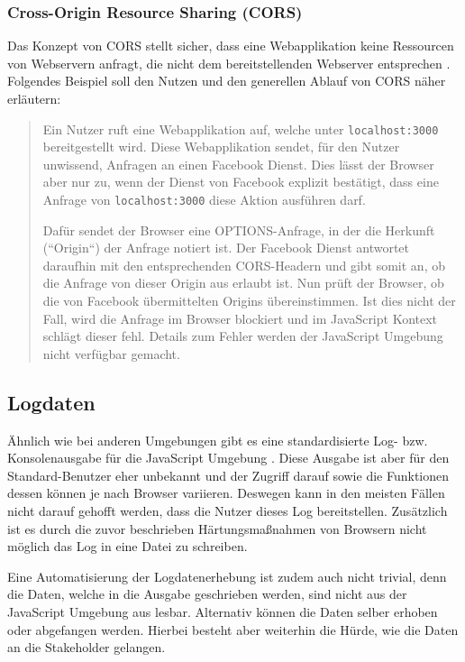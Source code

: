 \subsubsection{Cross-Origin Resource Sharing (CORS)}

Das Konzept von CORS stellt sicher, dass eine Webapplikation keine Ressourcen von Webservern anfragt, die nicht dem bereitstellenden Webserver entsprechen \cite{MDNCORS}. Folgendes Beispiel soll den Nutzen und den generellen Ablauf von CORS näher erläutern:

\begin{quotation}
Ein Nutzer ruft eine Webapplikation auf, welche unter \texttt{localhost:3000} bereitgestellt wird. Diese Webapplikation sendet, für den Nutzer unwissend, Anfragen an einen Facebook Dienst. Dies lässt der Browser aber nur zu, wenn der Dienst von Facebook explizit bestätigt, dass eine Anfrage von \texttt{localhost:3000} diese Aktion ausführen darf.

Dafür sendet der Browser eine OPTIONS-Anfrage, in der die Herkunft (``Origin``) der Anfrage notiert ist. Der Facebook Dienst antwortet daraufhin mit den entsprechenden CORS-Headern und gibt somit an, ob die Anfrage von dieser Origin aus erlaubt ist. Nun prüft der Browser, ob die von Facebook übermittelten Origins übereinstimmen. Ist dies nicht der Fall, wird die Anfrage im Browser blockiert und im JavaScript Kontext schlägt dieser fehl. Details zum Fehler werden der JavaScript Umgebung nicht verfügbar gemacht.
\end{quotation}

\subsection{Logdaten}

Ähnlich wie bei anderen Umgebungen gibt es eine standardisierte Log- bzw. Konsolenausgabe für die JavaScript Umgebung \cite{MDNConsole}. Diese Ausgabe ist aber für den Standard-Benutzer eher unbekannt und der Zugriff darauf sowie die Funktionen dessen können je nach Browser variieren. Deswegen kann in den meisten Fällen nicht darauf gehofft werden, dass die Nutzer dieses Log bereitstellen. Zusätzlich ist es durch die zuvor beschrieben Härtungsmaßnahmen von Browsern nicht möglich das Log in eine Datei zu schreiben.

Eine Automatisierung der Logdatenerhebung ist zudem auch nicht trivial, denn die Daten, welche in die Ausgabe geschrieben werden, sind nicht aus der JavaScript Umgebung aus lesbar. Alternativ können die Daten selber erhoben oder abgefangen werden. Hierbei besteht aber weiterhin die Hürde, wie die Daten an die Stakeholder gelangen.

